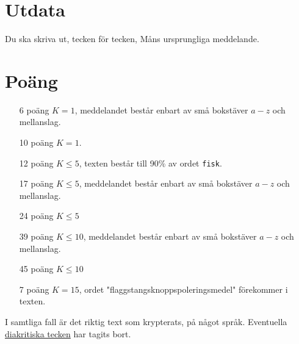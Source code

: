 \section*{Utdata}
Du ska skriva ut, tecken för tecken, Måns ursprungliga meddelande.

\section*{Poäng}

\begin{enumerate}
	\item[6 poäng] $K = 1$, meddelandet består enbart av små bokstäver $a-z$ och mellanslag.
	\item[10 poäng] $K = 1$.
  \item[12 poäng] $K \le 5$, texten består till 90\% av ordet \texttt{fisk}.
	\item[17 poäng] $K \le 5$, meddelandet består enbart av små bokstäver $a-z$ och mellanslag.
  \item[24 poäng] $K \le 5$
	\item[39 poäng] $K \le 10$, meddelandet består enbart av små bokstäver $a-z$ och mellanslag.
  \item[45 poäng] $K \le 10$
	\item[7 poäng] $K = 15$, ordet "flaggstangsknoppspoleringsmedel" förekommer i texten.
\end{enumerate}

I samtliga fall är det riktig text som krypterats, på något språk. Eventuella \href{https://sv.wikipedia.org/wiki/Diakritiskt\_tecken}{diakritiska tecken} har tagits bort.

